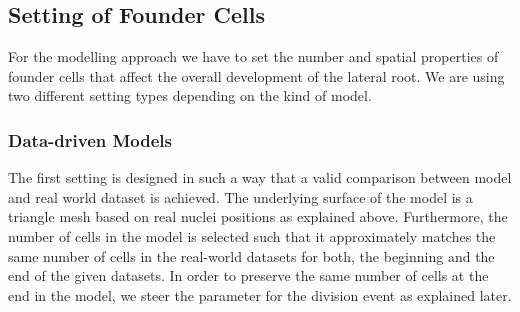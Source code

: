 \documentclass[11pt,a4paper, final]{article}
\begin{document}
\subsection{Setting of Founder Cells}
\noindent
For the modelling approach we have to set the number and spatial properties of founder cells that affect the overall development of the lateral root. We are using two different setting types depending on the kind of model.

\subsubsection{Data-driven Models}
\noindent
The first setting is designed in such a way that a valid comparison between model and real world dataset is achieved. The underlying surface of the model is a triangle mesh based on real nuclei positions as explained above. Furthermore, the number of cells in the model is selected such that it approximately matches the same number of cells in the real-world datasets for both, the beginning and the end of the given datasets. In order to preserve the same number of cells at the end in the model, we steer the parameter for the division event as explained later.
\end{document}
